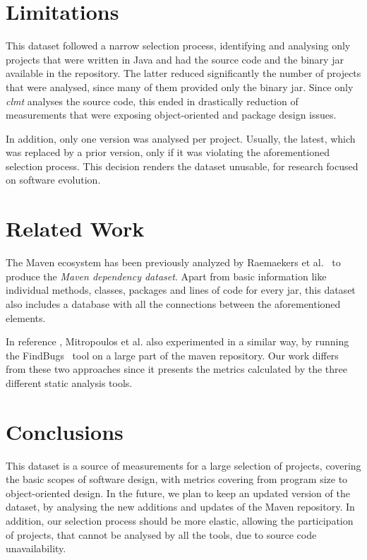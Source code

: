 \documentclass{sig-alternate}
\begin{document}
\section{Limitations}
\label{sec:limit}

This dataset followed a narrow selection process, identifying and analysing only projects that were written in Java and had the source code and the binary {\sc jar} available in the repository. The latter reduced significantly the number of projects that were analysed, since many of them provided only the binary {\sc jar}. Since only \textit{clmt} analyses the source code, this ended in drastically reduction of measurements that were exposing object-oriented and package design issues.

In addition, only one version was analysed per project. Usually, the latest, which was replaced by a prior version, only if it was violating the aforementioned selection process. This decision renders the dataset unusable,
for research focused on software evolution.

\section{Related Work}
\label{sec:rel}

The Maven ecosystem has been previously analyzed by Raemaekers et al.~\cite{RDV13} to produce the {\it Maven dependency dataset}. Apart from basic information like individual methods, classes, packages and lines of code for every {\sc jar}, this dataset also includes a database with all the connections between the aforementioned elements.

In reference \cite{MKLGS14}, Mitropoulos et al. also experimented in a similar way, by running the FindBugs~\cite{HP04} tool on a large part of the maven repository. Our work differs from these two approaches since it presents the metrics calculated by the three different static analysis tools.

\section{Conclusions}
\label{sec:conc}

This dataset is a source of measurements for a large selection of projects, covering the basic scopes of software design, with metrics covering from program size to object-oriented design. In the future, we plan to keep an updated version of the dataset, by analysing the new additions and updates of the Maven repository.
In addition, our selection process should be more elastic, allowing the participation of projects, that cannot be analysed by all the tools, due to source code unavailability.
\end{document}
